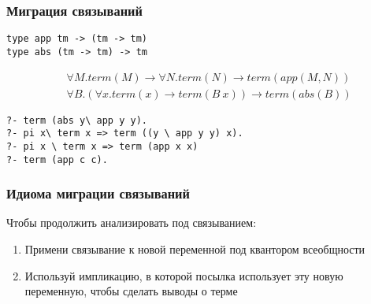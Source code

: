 \documentclass{beamer}
\begin{document}
\begin{frame}[fragile]
  \frametitle{Миграция связываний}

  \begin{verbatim}
type app tm -> (tm -> tm)
type abs (tm -> tm) -> tm
  \end{verbatim}

\vspace{-1cm}

\begin{align*}
  & \forall M. term(M) \to \forall N. term(N) \to term(app(M,N)) \\
  & \forall B. (\forall x. term(x) \to term(B \ x)) \to term(abs(B))
\end{align*}

\vspace{0.3cm}

\begin{verbatim}
?- term (abs y\ app y y).
?- pi x\ term x => term ((y \ app y y) x).
?- pi x \ term x => term (app x x)
?- term (app c c).
\end{verbatim}

\end{frame}

\begin{frame}[fragile]
  \frametitle{Идиома миграции связываний}

  Чтобы продолжить анализировать под связыванием:
  \begin{enumerate}
    \item Примени связывание к новой переменной под квантором всеобщности
    \item Используй импликацию, в которой посылка использует эту новую переменную, чтобы сделать выводы о терме
  \end{enumerate}
\end{frame}
\end{document}
